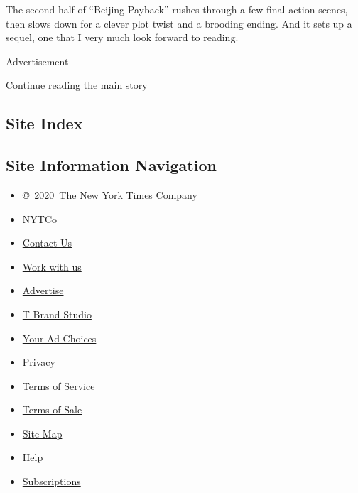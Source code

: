 The second half of ``Beijing Payback'' rushes through a few final action
scenes, then slows down for a clever plot twist and a brooding ending.
And it sets up a sequel, one that I very much look forward to reading.

Advertisement

\protect\hyperlink{after-bottom}{Continue reading the main story}

\hypertarget{site-index}{%
\subsection{Site Index}\label{site-index}}

\hypertarget{site-information-navigation}{%
\subsection{Site Information
Navigation}\label{site-information-navigation}}

\begin{itemize}
\tightlist
\item
  \href{https://help.nytimes3xbfgragh.onion/hc/en-us/articles/115014792127-Copyright-notice}{©~2020~The
  New York Times Company}
\end{itemize}

\begin{itemize}
\tightlist
\item
  \href{https://www.nytco.com/}{NYTCo}
\item
  \href{https://help.nytimes3xbfgragh.onion/hc/en-us/articles/115015385887-Contact-Us}{Contact
  Us}
\item
  \href{https://www.nytco.com/careers/}{Work with us}
\item
  \href{https://nytmediakit.com/}{Advertise}
\item
  \href{http://www.tbrandstudio.com/}{T Brand Studio}
\item
  \href{https://www.nytimes3xbfgragh.onion/privacy/cookie-policy\#how-do-i-manage-trackers}{Your
  Ad Choices}
\item
  \href{https://www.nytimes3xbfgragh.onion/privacy}{Privacy}
\item
  \href{https://help.nytimes3xbfgragh.onion/hc/en-us/articles/115014893428-Terms-of-service}{Terms
  of Service}
\item
  \href{https://help.nytimes3xbfgragh.onion/hc/en-us/articles/115014893968-Terms-of-sale}{Terms
  of Sale}
\item
  \href{https://spiderbites.nytimes3xbfgragh.onion}{Site Map}
\item
  \href{https://help.nytimes3xbfgragh.onion/hc/en-us}{Help}
\item
  \href{https://www.nytimes3xbfgragh.onion/subscription?campaignId=37WXW}{Subscriptions}
\end{itemize}
